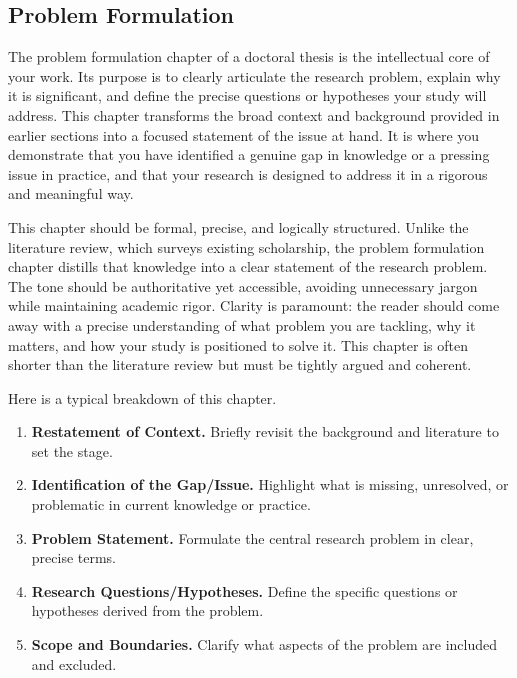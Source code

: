 \documentclass[PCOM,Thesis,Review]{mpThesis}
\newcommand{\Hd}[1]{{\color{SteelBlue}\bf#1.}}
\begin{document}
\begin{MainMatter}
\chapter{Problem Formulation}
\label{ch:problem}
\minitoc

\begin{Remark}
The problem formulation chapter of a doctoral thesis is the intellectual core of your work.
Its purpose is to clearly articulate the research problem, explain why it is significant, and define the precise questions or hypotheses your study will address.
This chapter transforms the broad context and background provided in earlier sections into a focused statement of the issue at hand.
It is where you demonstrate that you have identified a genuine gap in knowledge or a pressing issue in practice, and that your research is designed to address it in a rigorous and meaningful way.

This chapter should be formal, precise, and logically structured.
Unlike the literature review, which surveys existing scholarship, the problem formulation chapter distills that knowledge into a clear statement of the research problem.
The tone should be authoritative yet accessible, avoiding unnecessary jargon while maintaining academic rigor.
Clarity is paramount: the reader should come away with a precise understanding of what problem you are tackling, why it matters, and how your study is positioned to solve it.
This chapter is often shorter than the literature review but must be tightly argued and coherent.

Here is a typical breakdown of this chapter.
\begin{enumerate}
\item \Hd{Restatement of Context}
Briefly revisit the background and literature to set the stage.

\item \Hd{Identification of the Gap/Issue}
Highlight what is missing, unresolved, or problematic in current knowledge or practice.

\item \Hd{Problem Statement}
Formulate the central research problem in clear, precise terms.

\item \Hd{Research Questions/Hypotheses}
Define the specific questions or hypotheses derived from the problem.

\item \Hd{Scope and Boundaries}
Clarify what aspects of the problem are included and excluded.


\end{enumerate}
\end{Remark}
\end{MainMatter}
\end{document}

